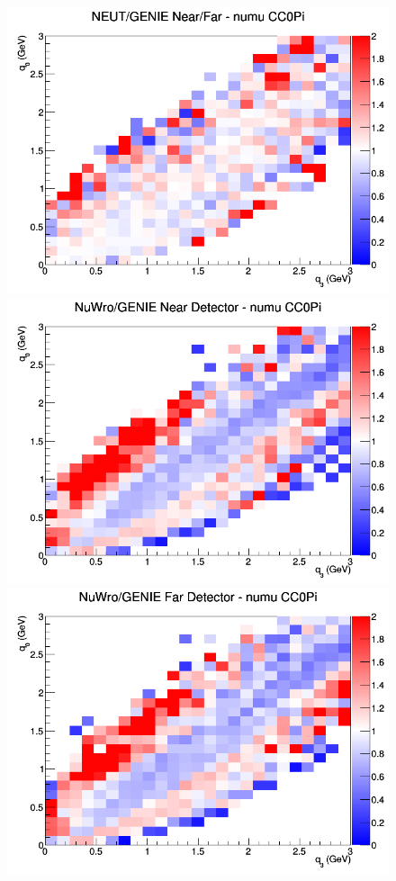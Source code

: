 \documentclass[12pt]{article}
\begin{document}
\begin{figure}[h]
\endminipage
{}
\includegraphics[width=\linewidth]{eff_q0_q3/LAr/ratios/CC0Pi_NEUT_GENIE_numu_NF_q3_q0.png}
\endminipage
\newline
{}
\includegraphics[width=\linewidth]{eff_q0_q3/LAr/ratios/CC0Pi_NuWro_GENIE_numu_near_q3_q0.png}
\endminipage
{}
\includegraphics[width=\linewidth]{eff_q0_q3/LAr/ratios/CC0Pi_NuWro_GENIE_numu_far_q3_q0.png}

\end{figure}
\end{document}

